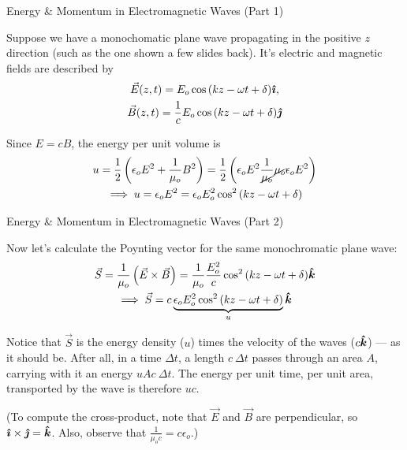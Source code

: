 \documentclass{beamer}
\begin{document}
\begin{frame}{Energy \& Momentum in Electromagnetic Waves (Part 1)}

Suppose we have a monochomatic plane wave propagating in the positive $z$ direction (such as the one shown a few slides back). It's electric and magnetic fields are described by
\begin{gather*}
    \vec{E} (z, t) = E_o \cos{\left( kz - \omega t + \delta \right)} \bm{\hat{\imath}}, \\
    \vec{B} (z, t) = \frac{1}{c} E_o \cos{\left( kz - \omega t + \delta \right)} \bm{\hat{\jmath}}
\end{gather*}

Since $E = cB$, the energy per unit volume is
\begin{gather*}
    u = \frac{1}{2} \left( \epsilon_o E^2 + \frac{1}{\mu_o} B^2 \right) = \frac{1}{2} \left( \epsilon_o E^2 \frac{1}{\cancel{\mu_o}} \cancel{\mu_o} \epsilon_o E^2 \right) \\
    \implies u = \epsilon_o E^2 = \epsilon_o E_o^2 \cos^2{\left( kz - \omega t + \delta \right)}
\end{gather*}

\end{frame}

\begin{frame}{Energy \& Momentum in Electromagnetic Waves (Part 2)}

Now let's calculate the Poynting vector for the same monochromatic plane wave:
\begin{gather*}
    \vec{S} = \frac{1}{\mu_o} \left( \vec{E} \times \vec{B} \right) = \frac{1}{\mu_o} \frac{E_o^2}{c} \cos^2{\left( kz - \omega t + \delta \right)} \bm{\hat{k}} \\
    \implies \vec{S} = c \underbrace{\epsilon_o E_o^2 \cos^2{\left( kz - \omega t + \delta \right)}}_{u} \bm{\hat{k}}
\end{gather*}

Notice that $\vec{S}$ is the energy density ($u$) times the velocity of the waves ($c \bm{\hat{k}}$) --- as it should be. After all, in a time $\Delta t$, a length $c\ \Delta t$ passes through an area $A$, carrying with it an energy $u A c\ \Delta t$. The energy per unit time, per unit area, transported by the wave is therefore $uc$.

\vfill

(To compute the cross-product, note that $\vec{E}$ and $\vec{B}$ are perpendicular, so $\bm{\hat{\imath}} \times \bm{\hat{\jmath}} = \bm{\hat{k}}$. Also, observe that $\frac{1}{\mu_o c} = c \epsilon_o$.)

\end{frame}
\end{document}
